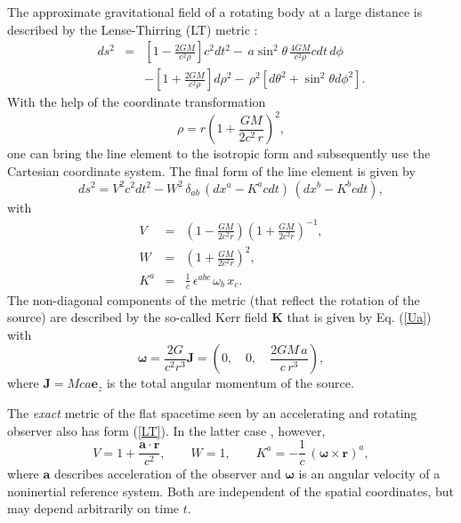 \documentclass[preprint,showpacs,preprintnumbers,amsmath,amssymb]{revtex4}
\begin{document}
The approximate gravitational field of a rotating body at a large distance
is described by the Lense-Thirring (LT) metric \cite{LT}:
\begin{eqnarray}
ds^2 &=& \left[ 1 - {\frac {2GM} {c^2\rho}} \right]c^2dt^2
-\,a\sin^2\!\theta\, {\frac {4GM} {c^2\rho}}
cdt\,d\phi\nonumber\\
&& -\left[1 + {\frac {2GM} {c^2\rho}} \right]d\rho^2
-\,\rho^2\left[d\theta^2 + \sin^2\theta d\phi^2\right].
\label{asymKerr}
\end{eqnarray}
With the help of the coordinate transformation
\begin{equation}
\rho = r\left(1 + {\frac {GM} {2c^2\,r}}\right)^2,
\end{equation}
one can bring the line element to the isotropic form and
subsequently use the Cartesian coordinate system. The final form
of the line element is given by
\begin{equation}\label{LT}
ds^2 = V^2c^2dt^2 - W^2\,\delta_{ab}\,(dx^a - K^acdt)\,(dx^b - K^bcdt),
\end{equation}
with
\begin{eqnarray}
V &=& \left(1 - {\frac {GM}{2c^2r}}\right)
\left(1 + {\frac {GM} {2c^2r}}\right)^{-1},\label{Vk}\\
W &=& \left(1 + {\frac {GM} {2c^2r}}\right)^2,\label{Wk}\\
K^a &=& {\frac 1c}\,\epsilon^{abc}\,\omega_b\,x_c.\label{Ua}
\end{eqnarray}
The non-diagonal components of the metric (that reflect the rotation
of the source) are described by the so-called Kerr field $\bm K$
that is given by Eq. (\ref{Ua}) with
\begin{equation}
\bm\omega =\frac{2G}{c^2r^3}\bm J= \left(0,\quad 0,\quad
\frac{2GM\,a}{c\,r^3}\right),\label{omega}
\end{equation}
where $\bm J=Mca\bm e_z$ is the total angular momentum of the source.

The {\it exact} metric of the flat spacetime seen by an
accelerating and rotating observer also has form (\ref{LT}).
In the latter case \cite{HN}, however,
\begin{equation}
V = 1 + {\frac {{\bm a}\cdot{\bm r}}{c^2}},\qquad W = 1,\qquad
K^a =-{\frac 1c}\,(\bm\omega\times\bm r)^a,\label{VWni}
\end{equation}
where ${\bm a}$ describes acceleration of the observer and $\bm\omega$
is an angular velocity of a noninertial reference system. Both are
independent of the spatial coordinates, but may depend arbitrarily
on time $t$.
\end{document}
